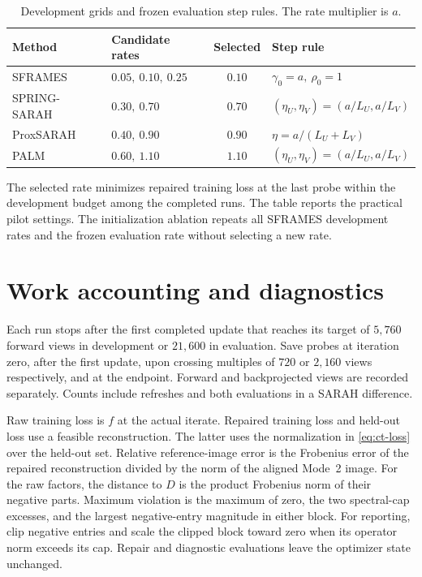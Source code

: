 \documentclass[11pt]{article}
\begin{document}
\begin{table}[htbp]
  \centering
  \caption{Development grids and frozen evaluation step rules. The rate multiplier is \(a\).}
  \label{tab:ct-rates}
  \begin{tabular}{@{}llcl@{}}
    \toprule
    Method & Candidate rates & Selected & Step rule \\
    \midrule
SFRAMES & \(0.05,\ 0.10,\ 0.25\) & \(0.10\) & \(\gamma_0=a,\ \rho_0=1\) \\
SPRING-SARAH & \(0.30,\ 0.70\) & \(0.70\) & \((\eta_U,\eta_V)=(a/L_U,a/L_V)\) \\
ProxSARAH & \(0.40,\ 0.90\) & \(0.90\) & \(\eta=a/(L_U+L_V)\) \\
PALM & \(0.60,\ 1.10\) & \(1.10\) & \((\eta_U,\eta_V)=(a/L_U,a/L_V)\) \\
    \bottomrule
  \end{tabular}
\end{table}

The selected rate minimizes repaired training loss at the last probe within
the development budget among the completed runs. The table reports the
practical pilot settings. The initialization ablation repeats all SFRAMES development rates and the frozen evaluation rate without selecting a new rate.

\section{Work accounting and diagnostics}
\label{sec:ct-work}

Each run stops after the first completed update that reaches its target of \(5{,}760\) forward views in development or \(21{,}600\) in evaluation. Save probes at iteration zero, after the first update, upon crossing multiples of \(720\) or \(2{,}160\) views respectively, and at the endpoint. Forward and backprojected views are recorded separately. Counts include refreshes and both evaluations in a SARAH difference.

Raw training loss is \(f\) at the actual iterate. Repaired training loss and
held-out loss use a feasible reconstruction. The latter uses the normalization in
\eqref{eq:ct-loss} over the held-out set. Relative reference-image error is the
Frobenius error of the repaired reconstruction divided by the norm of the
aligned Mode~2 image. For the raw factors, the distance to \(D\) is the product
Frobenius norm of their negative parts. Maximum violation is the maximum of zero,
the two spectral-cap excesses, and the largest negative-entry magnitude in
either block. For reporting, clip negative entries and scale the clipped block toward zero when its operator norm exceeds its cap.
Repair and diagnostic evaluations leave the optimizer state unchanged.
\end{document}
